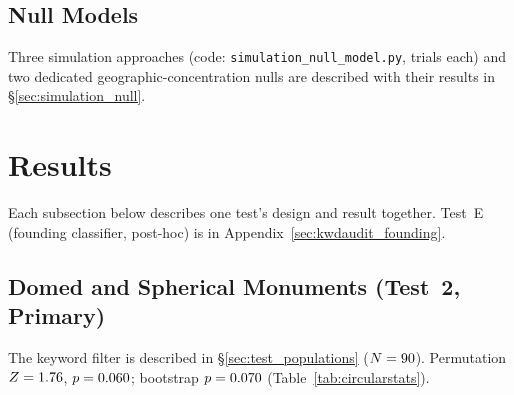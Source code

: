\documentclass[HARVARD,twocolumn]{USG}
\begin{document}
\subsection{Null Models}
\label{sec:methods_simulation}

Three simulation approaches (code: \texttt{simulation\_null\_model.py},
\simNperms{} trials each) and two dedicated geographic-concentration nulls
are described with their results in \S\ref{sec:simulation_null}.

\section{Results}
\label{sec:results}

Each subsection below describes one test's design and result together.
Test~E (founding classifier, post-hoc) is in Appendix~\ref{sec:kwdaudit_founding}.

\subsection{Domed and Spherical Monuments (Test~2, Primary)}
\label{sec:resultscircular}

The keyword filter is described in \S\ref{sec:test_populations} ($N = 90$).
Permutation $Z = 1.76$,
$p = 0.060$; bootstrap $p = 0.070$
(Table~\ref{tab:circularstats}).
\end{document}
